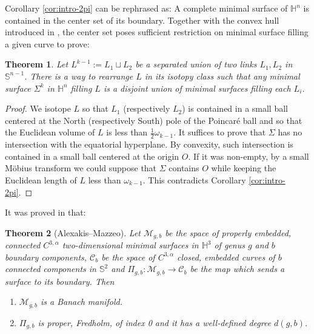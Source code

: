 \documentclass[11pt]{article}
\newtheorem{theorem}{Theorem}
\begin{document}
Corollary \ref{cor:intro-2pi} can be rephrased as: A complete minimal surface of \(\mathbb{H}^n\) is
contained in the center set of its boundary. 
Together with the convex hull introduced in
\cite{Anderson82_CompleteMinimalVarieties}, 
the center set poses sufficient restriction on minimal surface filling a given curve to prove:

\begin{theorem}
\label{thm:separation}
Let \(L^{k-1}:=  L_1 \sqcup L_2\) be a separated union of two links \(L_1,
L_2\) in \(\mathbb{S}^{n-1}\). There is a way to rearrange \(L\) in its isotopy class such
that any minimal surface \(\Sigma^k\) in \(\mathbb{H}^n\) filling \(L\) is a disjoint union of minimal surfaces filling
each \(L_i\).
\end{theorem}
\begin{proof}
We isotope \(L\) so that \(L_1\) (respectively \(L_2\)) is contained in a small ball centered at the
North (respectively South) pole of the Poincaré ball and so that the Euclidean volume of \(L\) is less than \(\frac{1}{2}\omega_{k-1}\). 
It suffices to prove that \(\Sigma\) has no intersection with the equatorial hyperplane. By convexity, such
intersection is contained in a small ball centered at the origin \(O\). If it was
non-empty, by a small Möbius transform we could suppose that \(\Sigma\) contains \(O\) while keeping the Euclidean length of \(L\) less than \(\omega_{k-1}\). 
This contradicts Corollary \ref{cor:intro-2pi}.
\end{proof}

It was proved in \cite{Alexakis.Mazzeo10_RenormalizedAreaProperly} that:

\begin{theorem}[Alexakis--Mazzeo]
\label{thm:AM}
Let  \(\mathcal{M}_{g, b}\) be the space of properly embedded, connected \(C^{3,\alpha}\)
   two-dimensional minimal surfaces in \(\mathbb{H}^3\) of genus \(g\) and \(b\) boundary components, \(\mathcal{C}_b\)
   be the space of \(C^{3,\alpha}\) closed, embedded curves of \(b\)
   connected components in \(\mathbb{S}^2\) and  \(\Pi_{g,b}:\mathcal{M}_{g,b} \longrightarrow
   \mathcal{C}_b\) be the map which sends a surface to its boundary. Then
\begin{enumerate}
\item \(\mathcal{M}_{g, b}\) is a Banach manifold.
\item \(\Pi_{g,b}\) is proper, Fredholm, of index 0 and it has a well-defined degree \(d(g,b)\).
\end{enumerate}
\end{theorem}
\end{document}
